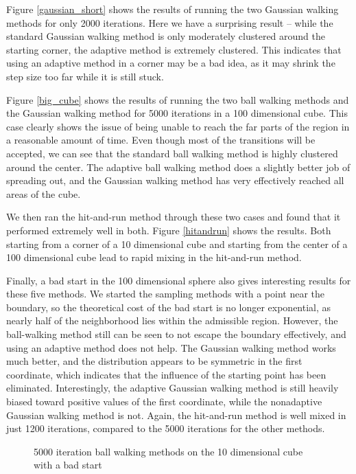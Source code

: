 \documentclass[11pt]{article}
\begin{document}
Figure \ref{gaussian_short} shows the results of running the two Gaussian walking methods for only 2000 iterations. Here we have a surprising result -- while the standard Gaussian walking method is only moderately clustered around the starting corner, the adaptive method is extremely clustered. This indicates that using an adaptive method in a corner may be a bad idea, as it may shrink the step size too far while it is still stuck.

Figure \ref{big_cube} shows the results of running the two ball walking methods and the Gaussian walking method for 5000 iterations in a 100 dimensional cube. This case clearly shows the issue of being unable to reach the far parts of the region in a reasonable amount of time. Even though most of the transitions will be accepted, we can see that the standard ball walking method is highly clustered around the center. The adaptive ball walking method does a slightly better job of spreading out, and the Gaussian walking method has very effectively reached all areas of the cube.

We then ran the hit-and-run method through these two cases and found that it performed extremely well in both. Figure \ref{hitandrun} shows the results. Both starting from a corner of a 10 dimensional cube and starting from the center of a 100 dimensional cube lead to rapid mixing in the hit-and-run method.

Finally, a bad start in the 100 dimensional sphere also gives interesting results for these five methods. We started the sampling methods with a point near the boundary, so the theoretical cost of the bad start is no longer exponential, as nearly half of the neighborhood lies within the admissible region. However, the ball-walking method still can be seen to not escape the boundary effectively, and using an adaptive method does not help. The Gaussian walking method works much better, and the distribution appears to be symmetric in the first coordinate, which indicates that the influence of the starting point has been eliminated. Interestingly, the adaptive Gaussian walking method is still heavily biased toward positive values of the first coordinate, while the nonadaptive Gaussian walking method is not. Again, the hit-and-run method is well mixed in just 1200 iterations, compared to the 5000 iterations for the other methods.

\begin{figure}
\centering
{}
\caption{5000 iteration ball walking methods on the 10 dimensional cube with a bad start}
\label{ballwalking}
\end{figure}
\end{document}
